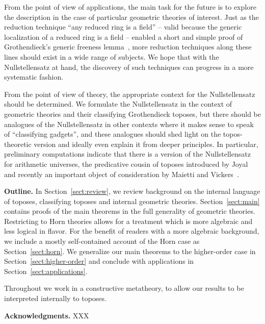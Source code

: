 \documentclass[oneside,reqno]{amsart}
\theoremstyle{definition}
\theoremstyle{plain}
\theoremstyle{remark}
\renewcommand{\_}{\mathpunct{.}\,}
\newcommand{\?}{\,{:}\,}
\renewcommand{\paragraph}[1]{\noindent\textbf{#1.}}
\begin{document}
From the point of view of applications, the main task for the future is to
explore the description in the case of particular geometric theories of
interest. Just as the reduction technique ``any reduced ring is a field'' --
valid because the generic localization of a reduced ring is a field -- enabled
a short and simple proof of Grothendieck's generic freeness
lemma~\cite[Section~11.5]{blechschmidt:phd}, more reduction techniques along
these lines should exist in a wide range of subjects. We hope that with the
Nullstellensatz at hand, the discovery of such techniques can progress in a more
systematic fashion.

From the point of view of theory, the appropriate context for the
Nullstellensatz should be determined. We formulate the Nullstellensatz in the
context of geometric theories and their classifying Grothendieck toposes, but
there should be analogues of the Nullstellensatz in other contexts where it
makes sense to speak of ``classifying gadgets'', and these analogues should
shed light on the topos-theoretic version and ideally even explain it from deeper
principles. In particular, preliminary computations indicate that there is a
version of the Nullstellensatz for arithmetic universes, the predicative cousin
of toposes introduced by Joyal and recently an important object of
consideration by Maietti and Vickers~\cite{maietti:au,maietti-vickers:induction,vickers:sketches}.
\medskip


\paragraph{Outline} In Section~\ref{sect:review}, we review background on the
internal language of toposes, classifying toposes and internal geometric theories.
Section~\ref{sect:main} contains proofs of the main theorems in the
full generality of geometric theories. Restricting to Horn theories allows for
a treatment which is more algebraic and less logical in flavor. For the benefit
of readers with a more algebraic background, we include a mostly self-contained
account of the Horn case as Section~\ref{sect:horn}. We generalize our main
theorems to the higher-order case in Section~\ref{sect:higher-order} and
conclude with applications in Section~\ref{sect:applications}.

Throughout we work in a constructive metatheory, to allow our results to be
interpreted internally to toposes.
\medskip


\paragraph{Acknowledgments} XXX
\end{document}
